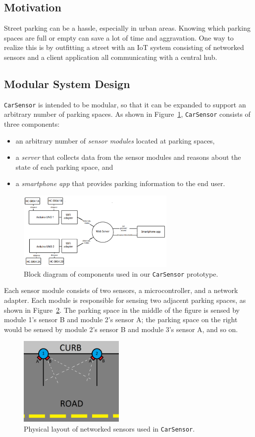 \documentclass[conference]{IEEEtran}
\begin{document}
\subsection{Motivation}
Street parking can be a hassle, especially in urban areas. Knowing which parking spaces are full or empty can save a lot of time and aggravation. One way to realize this is by outfitting a street with an IoT system consisting of networked sensors and a client application all communicating with a central hub.

\subsection{Modular System Design}
\texttt{CarSensor} is intended to be modular, so that it can be expanded to support an arbitrary number of parking spaces. As shown in Figure~\ref{fig_blockdiagram}, \texttt{CarSensor} consists of three components:
\begin{itemize}
\item an arbitrary number of \textit{sensor modules} located at parking spaces,
\item a \textit{server} that collects data from the sensor modules and reasons about the state of each parking space, and
\item a \textit{smartphone app} that provides parking information to the end user.
\end{itemize}

\begin{figure}[h]
\centering
\includegraphics[width=3.0in]{block_diagram_0.png}
\caption{Block diagram of components used in our \texttt{CarSensor} prototype.}
\label{fig_blockdiagram}
\end{figure}

Each sensor module consists of two sensors, a microcontroller, and a network adapter. Each module is responsible for sensing two adjacent parking spaces, as shown in Figure~\ref{fig_curb}. The parking space in the middle of the figure is sensed by module 1's sensor B and module 2's sensor A; the parking space on the right would be sensed by module 2's sensor B and module 3's sensor A, and so on.
\begin{figure}[h]
\centering
\includegraphics[width=2.0in]{parkingspace.png}
\caption{Physical layout of networked sensors used in \texttt{CarSensor}.}
\label{fig_curb}
\end{figure}
\end{document}
